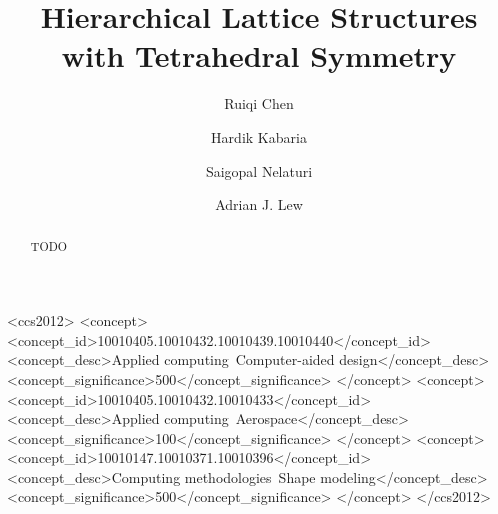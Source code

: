 \documentclass[acmtog]{acmart}
\begin{document}
\title{Hierarchical Lattice Structures with Tetrahedral Symmetry}

\author{Ruiqi Chen}
\author{Hardik Kabaria}
\author{Saigopal Nelaturi}

\author{Adrian J. Lew}

\renewcommand{\shortauthors}{Chen et al.}

\begin{abstract}
  TODO
\end{abstract}

\begin{CCSXML}
<ccs2012>
    <concept>
        <concept_id>10010405.10010432.10010439.10010440</concept_id>
        <concept_desc>Applied computing~Computer-aided design</concept_desc>
        <concept_significance>500</concept_significance>
        </concept>
    <concept>
        <concept_id>10010405.10010432.10010433</concept_id>
        <concept_desc>Applied computing~Aerospace</concept_desc>
        <concept_significance>100</concept_significance>
        </concept>
    <concept>
        <concept_id>10010147.10010371.10010396</concept_id>
        <concept_desc>Computing methodologies~Shape modeling</concept_desc>
        <concept_significance>500</concept_significance>
        </concept>
  </ccs2012>
\end{CCSXML}
\end{document}
